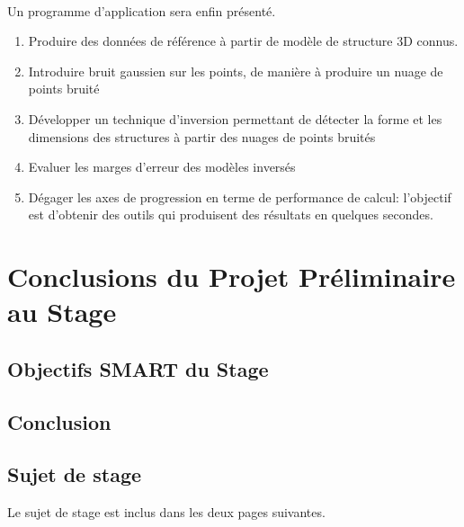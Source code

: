\documentclass[12pt,a4paper]{report}
\begin{document}
\paragraph{} Un programme d'application sera enfin présenté.

\begin{enumerate}
\item
Produire des données de référence à partir de modèle de structure 3D connus.
\item
Introduire bruit gaussien sur les points, de manière à produire un nuage de points bruité
\item
Développer un technique d'inversion permettant de détecter la forme
et les dimensions des structures à partir des nuages de points
bruités
\item
Evaluer les marges d'erreur des modèles inversés
\item
Dégager les axes de progression en terme de performance de calcul:
l'objectif est d'obtenir des outils qui produisent des résultats en
quelques secondes.
\end{enumerate}

\part{Conclusions du Projet Préliminaire au Stage}
  
\chapter{Objectifs SMART du Stage}
\chapter{Conclusion}

\begin{appendix}
\chapter{Sujet de stage}
Le sujet de stage est inclus dans les deux pages suivantes.

\end{appendix}



\end{document}
